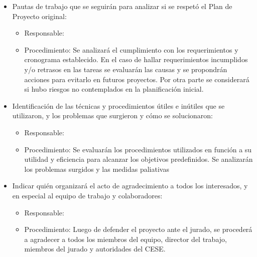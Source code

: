 \documentclass[11pt]{charter}
\begin{document}
\begin{itemize}
\item Pautas de trabajo que se seguirán para analizar si se respetó el Plan de Proyecto original:
\begin{itemize}
\item Responsable: \authorname
\item Procedimiento: Se analizará el cumplimiento con los requerimientos y cronograma establecido. En el caso de hallar requerimientos incumplidos y/o retrasos en las tareas se evaluarán las causas y se propondrán acciones para evitarlo en futuros proyectos. Por otra parte se considerará si hubo riesgos no contemplados en la planificación inicial.
\end{itemize} 
\item Identificación de las técnicas y procedimientos útiles e inútiles que se utilizaron, y los problemas que surgieron y cómo se solucionaron:
\begin{itemize}
\item Responsable: \authorname
\item Procedimiento: Se evaluarán los procedimientos utilizados en función a su utilidad y eficiencia para alcanzar los objetivos predefinidos. Se analizarán los problemas surgidos y las medidas paliativas
\end{itemize}
\item Indicar quién organizará el acto de agradecimiento a todos los interesados, y en especial al equipo de trabajo y colaboradores:
\begin{itemize}
\item Responsable: \authorname
\item Procedimiento: Luego de defender el proyecto ante el jurado, se procederá a agradecer a todos los miembros del equipo, director del trabajo, miembros del jurado y autoridades del CESE.
\end{itemize}
\end{itemize}
\end{document}
